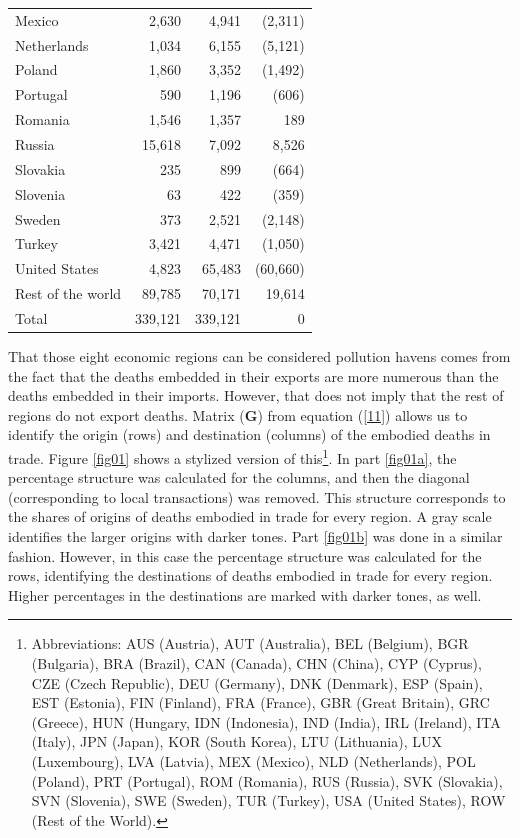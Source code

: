 \documentclass[a4paper,12pt, ]{article}
\begin{document}
\begin{table} [!hbtp]
\begin{center}
\begin{tabular}{lrrr}
Mexico &  2,630  &  4,941  & (2,311)\\ 
Netherlands &  1,034  &  6,155  & (5,121)\\ 
Poland &  1,860  &  3,352  & (1,492)\\ 
Portugal &  590  &  1,196  & (606)\\ 
Romania &  1,546  &  1,357  & 189 \\ 
Russia &  15,618  &  7,092  & 8,526 \\ 
Slovakia &  235  &  899  & (664)\\ 
Slovenia &  63  &  422  & (359)\\ 
Sweden &  373  &  2,521  & (2,148)\\ 
Turkey &  3,421  &  4,471  & (1,050)\\ 
United States &  4,823  &  65,483  & (60,660)\\ 
Rest of the world &  89,785  &  70,171  & 19,614   \\
\hline 
Total & 339,121 & 339,121 & 0 \\
\hline
\end{tabular}
\label{tab05} 
\end{center}
\end{table}

That those eight economic regions can be considered pollution havens comes from the fact that the deaths embedded in their exports are more numerous than the deaths embedded in their imports. However, that does not imply that the rest of regions do not export deaths. Matrix ($\mathbf{G}$) from equation (\ref{11}) allows us to identify the origin (rows) and destination (columns) of the embodied deaths in trade. Figure \ref{fig01} shows a stylized version of this\footnote{Abbreviations: AUS (Austria), AUT (Australia), BEL (Belgium), BGR (Bulgaria), BRA (Brazil), CAN (Canada), CHN (China), CYP (Cyprus), CZE (Czech Republic), DEU (Germany), DNK (Denmark), ESP (Spain), EST (Estonia), FIN (Finland), FRA (France), GBR (Great Britain), GRC (Greece), HUN (Hungary, IDN (Indonesia), IND (India), IRL (Ireland), ITA (Italy), JPN (Japan), KOR (South Korea), LTU (Lithuania), LUX (Luxembourg), LVA (Latvia), MEX (Mexico), NLD (Netherlands), POL (Poland), PRT (Portugal), ROM (Romania), RUS (Russia), SVK (Slovakia), SVN (Slovenia), SWE (Sweden), TUR (Turkey), USA (United States), ROW (Rest of the World).}. In part \ref{fig01a}, the percentage structure was calculated for the columns, and then the diagonal (corresponding to local transactions) was removed. This structure corresponds to the shares of origins of deaths embodied in trade for every region. A gray scale identifies the larger origins with darker tones. Part \ref{fig01b} was done in a similar fashion. However, in this case the percentage structure was calculated for the rows, identifying the destinations of deaths embodied in trade for every region. Higher percentages in the destinations are marked with darker tones, as well.
\end{document}
